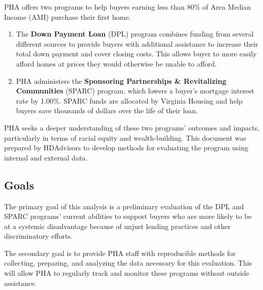 \documentclass[
  letterpaper,
  DIV=11,
  numbers=noendperiod]{scrartcl}
\begin{document}
\begin{tcolorbox}[enhanced jigsaw, coltitle=black, titlerule=0mm, breakable, colbacktitle=quarto-callout-note-color!10!white, opacityback=0, leftrule=.75mm, opacitybacktitle=0.6, rightrule=.15mm, title=\textcolor{quarto-callout-note-color}{\faInfo}\hspace{0.5em}{How PHA helps first-time homebuyers}, arc=.35mm, colback=white, bottomtitle=1mm, toptitle=1mm, colframe=quarto-callout-note-color-frame, bottomrule=.15mm, toprule=.15mm, left=2mm]

PHA offers two programs to help buyers earning less than 80\% of Area
Median Income (AMI) purchase their first home.

\begin{enumerate}
\def\labelenumi{\arabic{enumi}.}
\item
  The \textbf{Down Payment Loan} (DPL) program combines funding from
  several different sources to provide buyers with additional assistance
  to increase their total down payment and cover closing costs. This
  allows buyer to more easily afford homes at prices they would
  otherwise be unable to afford.
\item
  PHA administers the \textbf{Sponsoring Partnerships \& Revitalizing
  Communities} (SPARC) program, which lowers a buyer's mortgage interest
  rate by 1.00\%. SPARC funds are allocated by Virginia Housing and help
  buyers save thousands of dollars over the life of their loan.
\end{enumerate}

\end{tcolorbox}

PHA seeks a deeper understanding of these two programs' outcomes and
impacts, particularly in terms of racial equity and wealth-building.
This document was prepared by HDAdvisors to develop methods for
evaluating the program using internal and external data.

\hypertarget{goals}{%
\subsection{Goals}\label{goals}}

The primary goal of this analysis is a preliminary evaluation of the DPL
and SPARC programs' current abilities to support buyers who are more
likely to be at a systemic disadvantage because of unjust lending
practices and other discriminatory efforts.

The secondary goal is to provide PHA staff with reproducible methods for
collecting, preparing, and analyzing the data necessary for this
evaluation. This will allow PHA to regularly track and monitor these
programs without outside assistance.
\end{document}
